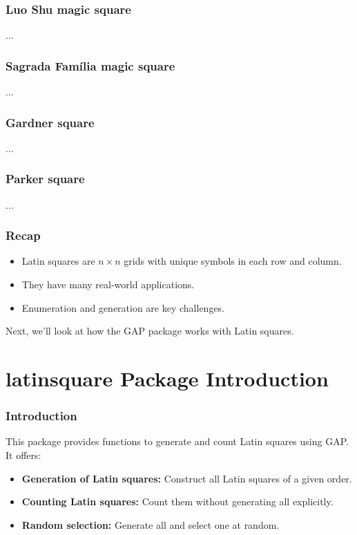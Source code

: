 \documentclass{beamer}
\begin{document}
\begin{frame}
\frametitle{Luo Shu magic square}
...
\end{frame}

\begin{frame}
\frametitle{Sagrada Família magic square}
...
\end{frame}

\begin{frame}
\frametitle{Gardner square}
...
\end{frame}

\begin{frame}
\frametitle{Parker square}
...
\end{frame}


\begin{frame}
\frametitle{Recap}
\begin{itemize}
  \item Latin squares are $n \times n$ grids with unique symbols in each row and column.
  \item They have many real-world applications.
  \item Enumeration and generation are key challenges.
\end{itemize}
Next, we'll look at how the GAP package works with Latin squares.
\end{frame}

\section{latinsquare Package Introduction}
\begin{frame}
\frametitle{Introduction}
This package provides functions to generate and count Latin squares using GAP. It offers:
\begin{itemize}
  \item \textbf{Generation of Latin squares:} Construct all Latin squares of a given order.
  \item \textbf{Counting Latin squares:} Count them without generating all explicitly.
  \item \textbf{Random selection:} Generate all and select one at random.
\end{itemize}
\end{frame}
\end{document}
